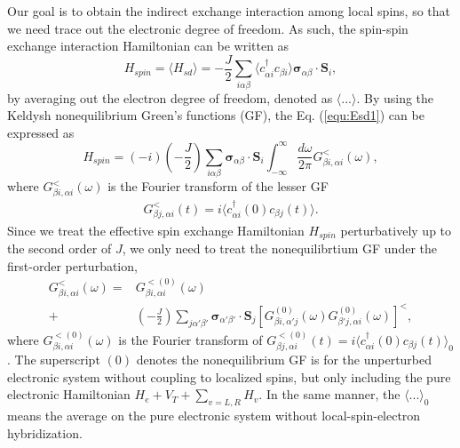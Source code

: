 \documentclass[aps,prb,twocolumn,showpacs,amssymb]{revtex4-1}
\begin{document}
Our goal is to obtain the indirect exchange interaction among local spins, so that we need trace out the electronic degree of freedom. As such, the spin-spin exchange interaction Hamiltonian can be written as
\begin{equation}\label{equ:Esd1}
H_{spin}=\langle H_{sd}\rangle=-\frac{J}{2}\sum\limits_{i\alpha\beta}\langle c_{{\alpha}i}^{\dagger}c_{{\beta}i}\rangle\bm{\sigma}_{\alpha\beta}\cdot\bm{S}_{i},
\end{equation}
by averaging out the electron degree of freedom, denoted as $\langle...\rangle$.
By using the Keldysh nonequilibrium Green's functions (GF)\cite{SW1996}, the Eq. (\ref{equ:Esd1}) can be expressed as
\begin{equation}\label{equ:Esd2}
H_{spin}=(-i)(-\frac{J}{2})\sum\limits_{i\alpha\beta}\bm{\sigma}_{\alpha\beta}\cdot\bm{S}_{i}\int^{\infty}_{-\infty}\frac{d\omega}{2\pi}
G_{{\beta}i,{\alpha}i}^{<}(\omega),
\end{equation}
where $G_{{\beta}i,{\alpha}i}^{<}(\omega)$ is the Fourier transform of the lesser GF
\begin{eqnarray}\label{equ:G<}
G_{{\beta}j,{\alpha}i}^{<}(t)=i\langle c_{{\alpha}i}^{\dagger}(0)c_{{\beta}j}(t)\rangle.
\end{eqnarray}
Since we treat the effective spin exchange Hamiltonian $H_{spin}$ perturbatively up to the second order of $J$, we only need to treat the nonequilibrtium GF under the first-order perturbation,
\begin{equation}\label{equ:Gw}
\begin{aligned}
G^{<}_{{\beta}i,{\alpha}i}(\omega)=&G_{{\beta}i,{\alpha}i}^{<(0)}(\omega)\\
+&(-\frac{J}{2})\sum\limits_{j\alpha'\beta'}\bm{\sigma}_{\alpha'\beta'}\cdot\bm{S}_{j}
[G_{{\beta}i,{\alpha'}j}^{(0)}(\omega)G_{{\beta'}j,{\alpha}i}^{(0)}(\omega)]^{<},
\end{aligned}
\end{equation}
where $G_{{\beta}i,{\alpha}i}^{<(0)}(\omega)$ is the Fourier transform of $G_{{\beta}j,{\alpha}i}^{<(0)}(t)=i\langle c_{{\alpha}i}^{\dagger}(0)c_{{\beta}j}(t)\rangle_0$. The superscript $(0)$ denotes the nonequilibrium GF is for the unperturbed electronic system without coupling to localized spins, but only including the pure electronic Hamiltonian $H_e+V_T+\sum_{v=L,R}H_v$. In the same manner, the $\langle ... \rangle_0$ means the average on the pure electronic system without local-spin-electron hybridization.
\end{document}
